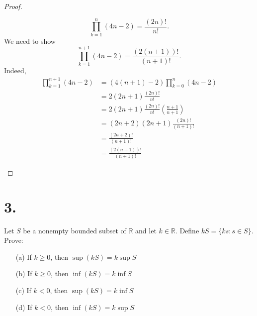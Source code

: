\documentclass[]{article}
\begin{document}
\begin{proof}
\begin{enumerate}
		$$
			\prod_{k = 1}^n (4n - 2) = \frac{(2n)!}{n!}.
		$$
		We need to show
		$$
			\prod_{k = 1}^{n + 1} (4n - 2) = \frac{(2(n + 1))!}{(n + 1)!}.
		$$
		Indeed,
		\begin{align*}
			\prod_{k = 1}^{n + 1} (4n - 2) &= (4(n + 1) - 2)\prod_{k = 0}^n (4n - 2) \\
			&= 2(2n + 1)\frac{(2n)!}{n!} \\
			&= 2(2n + 1)\frac{(2n)!}{n!} \left(\frac{n + 1}{n + 1}\right) \\
			&= (2n + 2)(2n + 1)\frac{(2n)!}{(n + 1)!} \\
			&= \frac{(2n + 2)!}{(n + 1)!} \\
			&= \frac{(2(n + 1))!}{(n + 1)!}
		\end{align*}
	\end{enumerate}
\end{proof}

\section*{3.}
Let $S$ be a nonempty bounded subset of $\mathbb{R}$ and let $k \in \mathbb{R}$. Define $kS =\{ks : s \in S\}$. Prove:
\begin{enumerate}
	\item[(a)] If $k \geq 0$, then $\sup(kS) = k\sup S$
	\item[(b)] If $k \geq 0$, then $\inf(kS) = k\inf S$
	\item[(c)] If $k < 0$, then $\sup(kS) = k\inf S$
	\item[(d)] If $k < 0$, then $\inf(kS) = k\sup S$
\end{enumerate}
\end{document}
